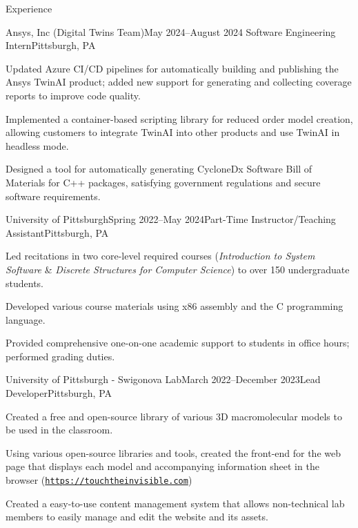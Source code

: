 \begin{rSection}{Experience}
    \begin{rSubsection}{Ansys, Inc (Digital Twins Team)}{May 2024–August 2024}
        {Software Engineering Intern}{Pittsburgh, PA}
        \item Updated Azure CI/CD pipelines for automatically building and publishing the Ansys TwinAI product; added new support for generating and collecting coverage reports to improve code quality.
        \item Implemented a container-based scripting library for reduced order model creation, allowing customers to integrate TwinAI into other products and use TwinAI in headless mode.
        \item Designed a tool for automatically generating CycloneDx Software Bill of Materials for C++ packages, satisfying government regulations and secure software requirements.
    \end{rSubsection}

    \begin{rSubsection}{University of Pittsburgh}{Spring 2022–May 2024}{Part-Time Instructor/Teaching Assistant}{Pittsburgh, PA}
        \item Led recitations in two core-level required courses (\textit{Introduction to System Software} \& \textit{Discrete Structures for Computer Science}) to over 150 undergraduate students.
        \item Developed various course materials using x86 assembly and the C programming language.
        \item Provided comprehensive one-on-one academic support to students in office hours; performed grading duties.
    \end{rSubsection}

    \begin{rSubsection}{University of Pittsburgh - Swigonova Lab}{March 2022–December 2023}{Lead Developer}{Pittsburgh, PA}
        \item Created a free and open-source library of various 3D macromolecular models to be used in the classroom.
        \item Using various open-source libraries and tools, created the front-end for the web page that displays each model and accompanying information sheet in the browser (\href{https://touchtheinvisible.com}{\nolinkurl{https://touchtheinvisible.com}})
        \item Created a easy-to-use content management system that allows non-technical lab members to easily manage and edit the website and its assets.
    \end{rSubsection}


\end{rSection}